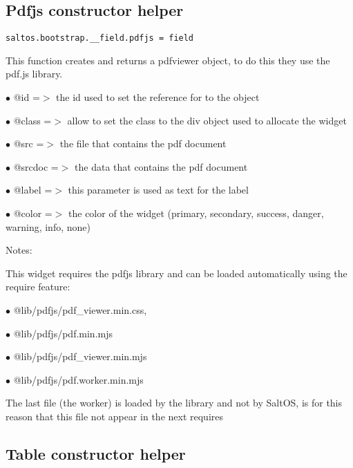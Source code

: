 \documentclass[a4paper]{book}
\begin{document}
\hypertarget{toc483}{}
\subsection{Pdfjs constructor helper}

\begin{lstlisting}
saltos.bootstrap.__field.pdfjs = field
\end{lstlisting}

This function creates and returns a pdfviewer object, to do this they use the pdf.js library.

\begin{compactitem}
\item[\color{myblue}$\bullet$] @id     =$>$ the id used to set the reference for to the object
\item[\color{myblue}$\bullet$] @class  =$>$ allow to set the class to the div object used to allocate the widget
\item[\color{myblue}$\bullet$] @src    =$>$ the file that contains the pdf document
\item[\color{myblue}$\bullet$] @srcdoc =$>$ the data that contains the pdf document
\item[\color{myblue}$\bullet$] @label  =$>$ this parameter is used as text for the label
\item[\color{myblue}$\bullet$] @color  =$>$ the color of the widget (primary, secondary, success, danger, warning, info, none)
\end{compactitem}

Notes:

This widget requires the pdfjs library and can be loaded automatically using the require
feature:

\begin{compactitem}
\item[\color{myblue}$\bullet$] @lib/pdfjs/pdf\_viewer.min.css,
\item[\color{myblue}$\bullet$] @lib/pdfjs/pdf.min.mjs
\item[\color{myblue}$\bullet$] @lib/pdfjs/pdf\_viewer.min.mjs
\item[\color{myblue}$\bullet$] @lib/pdfjs/pdf.worker.min.mjs
\end{compactitem}

The last file (the worker) is loaded by the library and not by SaltOS, is for this reason
that this file not appear in the next requires

\hypertarget{toc484}{}
\subsection{Table constructor helper}
\end{document}
